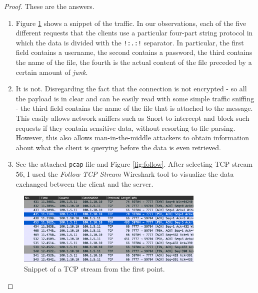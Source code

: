 \documentclass[a4paper,11pt,hidelinks]{article}
\begin{document}
\begin{proof}
    These are the answers.
    \begin{enumerate}
        \item Figure \ref{fig:network} shows a snippet of the traffic. In our observations, each of the five different requests that the clients use a particular four-part string protocol in which the data is divided with the \verb=!:.:!= separator. In particular, the first field contains a username, the second contains a password, the third contains the name of the file, the fourth is the actual content of the file preceded by a certain amount of \textit{junk}.
        \item It is not. Disregarding the fact that the connection is not encrypted - so all the payload is in clear and can be easily read with some simple traffic sniffing - the third field contains the name of the file that is attached to the message. This easily allows network sniffers such as Snort to intercept and block such requests if they contain sensitive data, without resorting to file parsing. However, this also allows man-in-the-middle attackers to obtain information about what the client is querying before the data is even retrieved.
        \item See the attached \verb=pcap= file and Figure \ref{fig:follow}. After selecting TCP stream 56, I used the \textit{Follow TCP Stream} Wireshark tool to visualize the data exchanged between the client and the server.
    \end{enumerate}
    
    \begin{figure}[ht!]
        \centering
        \includegraphics[width=0.8\textwidth]{../drawable/request.png}
        \caption{Snippet of a TCP stream from the first point.}
        \label{fig:network}
    \end{figure}
    

\end{proof}
\end{document}
